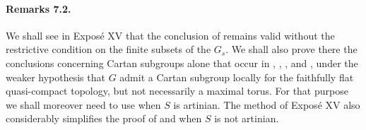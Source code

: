 \paragraph{\textbf{Remarks 7.2.}}
We shall see in Exposé XV that the conclusion of
\textup{} remains valid without the restrictive
condition on the finite subsets of the \(G_s\). We shall also prove
there the conclusions concerning Cartan subgroups alone that occur
in \textup{}, \textup{}, \textup{}, and \textup{}, under
the weaker hypothesis that \(G\) admit a Cartan subgroup locally for
the faithfully flat quasi-compact topology, but not necessarily a
maximal torus. For that purpose we shall moreover need to use 
when \(S\) is artinian. The method of Exposé XV also considerably
simplifies the proof of \textup{} and \textup{} when \(S\) is
not artinian.

